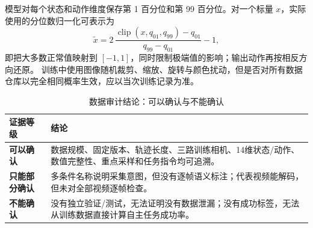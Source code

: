 模型对每个状态和动作维度保存第 1 百分位和第 99 百分位。对一个标量 $x$，实际使用的分位数归一化可表示为
\[
\tilde{x}=2\,\frac{\operatorname{clip}(x,q_{01},q_{99})-q_{01}}
{q_{99}-q_{01}}-1,
\]
即把大多数正常值映射到 $[-1,1]$，同时限制极端值的影响；输出动作再按相反方向还原。 训练中使用图像随机裁剪、缩放、旋转与颜色扰动，但是否对所有数据仓库以完全相同概率生效，应以当次训练记录为准。


\begin{table}[H]
\centering
\caption{数据审计结论：可以确认与不能确认}
\begin{tabularx}{\textwidth}{>{\bfseries}p{33mm}X}
\toprule
证据等级 & 结论\\
\midrule
可以确认 & 数据规模、固定版本、轨迹长度、三路训练相机、14维状态/动作、数值完整性、重点采样和任务指令均可追溯。\\
只能部分确认 & 多条件名称说明采集意图，但没有逐帧语义标注；代表视频能解码，但未对全部视频逐帧检查。\\
不能确认 & 没有独立验证/测试，无法证明没有数据泄漏；没有成功标签，无法从训练数据直接计算自主任务成功率。\\
\bottomrule
\end{tabularx}
\end{table}
